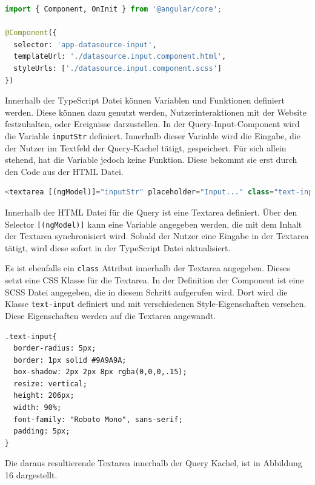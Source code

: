 \begin{lstlisting}[language=Python]
import { Component, OnInit } from '@angular/core';

@Component({
  selector: 'app-datasource-input',
  templateUrl: './datasource.input.component.html',
  styleUrls: ['./datasource.input.component.scss']
})
\end{lstlisting}

Innerhalb der TypeScript Datei können Variablen und Funktionen definiert werden. Diese können dazu genutzt werden, Nutzerinteraktionen mit der Website festzuhalten, oder Ereignisse darzustellen. In der Query-Input-Component wird die Variable \texttt{inputStr} definiert. Innerhalb dieser Variable wird die Eingabe, die der Nutzer im Textfeld der Query-Kachel tätigt, gespeichert. Für sich allein stehend, hat die Variable jedoch keine Funktion. Diese bekommt sie erst durch den Code aus der HTML Datei. 

\begin{lstlisting}[language=Python]
<textarea [(ngModel)]="inputStr" placeholder="Input..." class="text-input"></textarea>
\end{lstlisting}

Innerhalb der HTML Datei für die Query ist eine Textarea definiert. Über den Selector \texttt{[(ngModel)]} kann eine Variable angegeben werden, die mit dem Inhalt der Textarea synchronisiert wird. Sobald der Nutzer eine Eingabe in der Textarea tätigt, wird diese sofort in der TypeScript Datei aktualisiert. 

Es ist ebenfalls ein \texttt{class} Attribut innerhalb der Textarea angegeben. Dieses setzt eine CSS Klasse für die Textarea. In der Definition der Component ist eine SCSS Datei angegeben, die in diesem Schritt aufgerufen wird. Dort wird die Klasse \texttt{text-input} definiert und mit verschiedenen Style-Eigenschaften versehen. Diese Eigenschaften werden auf die Textarea angewandt.  

\begin{lstlisting}
.text-input{
  border-radius: 5px;
  border: 1px solid #9A9A9A;
  box-shadow: 2px 2px 8px rgba(0,0,0,.15);
  resize: vertical;
  height: 206px;
  width: 90%;
  font-family: "Roboto Mono", sans-serif;
  padding: 5px;
}
\end{lstlisting}

Die daraus resultierende Textarea innerhalb der \glqq Query\grqq{} Kachel, ist in Abbildung 16 dargestellt.


